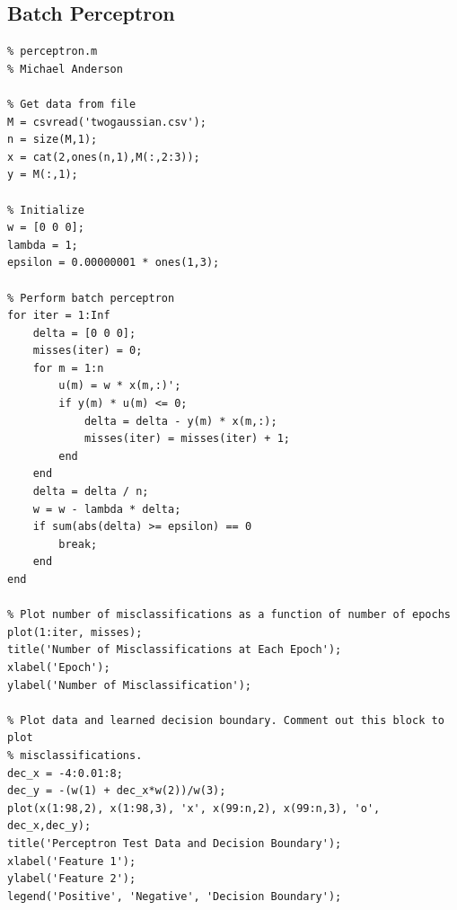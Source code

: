 \documentclass{article}
\begin{document}
\subsection{Batch Perceptron}
\begin{verbatim}
% perceptron.m
% Michael Anderson

% Get data from file
M = csvread('twogaussian.csv');
n = size(M,1);
x = cat(2,ones(n,1),M(:,2:3));
y = M(:,1);

% Initialize
w = [0 0 0];
lambda = 1;
epsilon = 0.00000001 * ones(1,3);

% Perform batch perceptron
for iter = 1:Inf
    delta = [0 0 0];
    misses(iter) = 0;
    for m = 1:n
        u(m) = w * x(m,:)';
        if y(m) * u(m) <= 0;
            delta = delta - y(m) * x(m,:);
            misses(iter) = misses(iter) + 1;
        end
    end
    delta = delta / n;
    w = w - lambda * delta;
    if sum(abs(delta) >= epsilon) == 0
        break;
    end
end

% Plot number of misclassifications as a function of number of epochs
plot(1:iter, misses);
title('Number of Misclassifications at Each Epoch');
xlabel('Epoch');
ylabel('Number of Misclassification');

% Plot data and learned decision boundary. Comment out this block to plot
% misclassifications.
dec_x = -4:0.01:8;
dec_y = -(w(1) + dec_x*w(2))/w(3);
plot(x(1:98,2), x(1:98,3), 'x', x(99:n,2), x(99:n,3), 'o', dec_x,dec_y);
title('Perceptron Test Data and Decision Boundary');
xlabel('Feature 1');
ylabel('Feature 2');
legend('Positive', 'Negative', 'Decision Boundary');
\end{verbatim}
\newpage
\end{document}

